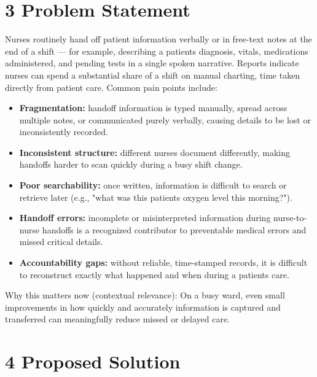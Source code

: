 \documentclass[
]{article}
\begin{document}
\section{3 Problem Statement}\label{problem-statement}

Nurses routinely hand off patient information verbally or in free-text
notes at the end of a shift --- for example, describing a
patient\textquotesingle s diagnosis, vitals, medications administered,
and pending tests in a single spoken narrative. Reports indicate nurses
can spend a substantial share of a shift on manual charting, time taken
directly from patient care. Common pain points include:

\begin{itemize}
\item
  \textbf{Fragmentation:} handoff information is typed manually, spread
  across multiple notes, or communicated purely verbally, causing
  details to be lost or inconsistently recorded.
\item
  \textbf{Inconsistent structure:} different nurses document
  differently, making handoffs harder to scan quickly during a busy
  shift change.
\item
  \textbf{Poor searchability:} once written, information is difficult to
  search or retrieve later (e.g., "what was this
  patient\textquotesingle s oxygen level this morning?").
\item
  \textbf{Handoff errors:} incomplete or misinterpreted information
  during nurse-to-nurse handoffs is a recognized contributor to
  preventable medical errors and missed critical details.
\item
  \textbf{Accountability gaps:} without reliable, time-stamped records,
  it is difficult to reconstruct exactly what happened and when during a
  patient\textquotesingle s care.
\end{itemize}

Why this matters now (contextual relevance): On a busy ward, even small
improvements in how quickly and accurately information is captured and
transferred can meaningfully reduce missed or delayed care.

\section{}\label{section}

\section{4 Proposed Solution}\label{proposed-solution}
\end{document}
